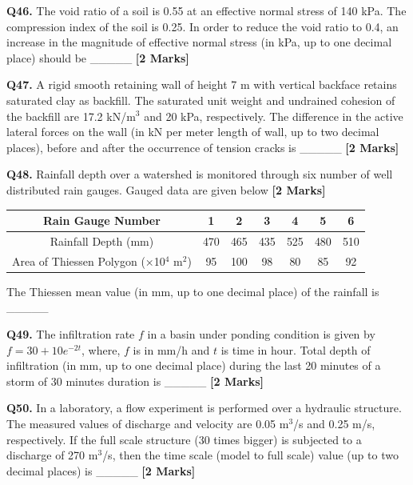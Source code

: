 \documentclass[11pt]{article}
\newcommand{\questionb}[2]{
    \noindent\textbf{Q#2.} #1 \hfill \textbf{[2 Marks]}
}
\begin{document}
\questionb{The void ratio of a soil is 0.55 at an effective normal stress of 140 kPa. The compression index of the soil is 0.25. In order to reduce the void ratio to 0.4, an increase in the magnitude of effective normal stress (in kPa, up to one decimal place) should be \_\_\_\_\_}{46}
\vspace{0.5cm}

\questionb{A rigid smooth retaining wall of height 7 m with vertical backface retains saturated clay as backfill. The saturated unit weight and undrained cohesion of the backfill are 17.2 kN/m\(^3\) and 20 kPa, respectively. The difference in the active lateral forces on the wall (in kN per meter length of wall, up to two decimal places), before and after the occurrence of tension cracks is \_\_\_\_\_}{47}
\vspace{0.5cm}

\questionb{Rainfall depth over a watershed is monitored through six number of well distributed rain gauges. Gauged data are given below}{48}

\begin{tabular}{|c|c|c|c|c|c|c|}
\hline
Rain Gauge Number & 1 & 2 & 3 & 4 & 5 & 6 \\
\hline
Rainfall Depth (mm) & 470 & 465 & 435 & 525 & 480 & 510 \\
Area of Thiessen Polygon (×10\(^4\) m\(^2\)) & 95 & 100 & 98 & 80 & 85 & 92 \\
\hline
\end{tabular}

The Thiessen mean value (in mm, up to one decimal place) of the rainfall is \_\_\_\_\_
\vspace{0.5cm}

\questionb{The infiltration rate \( f \) in a basin under ponding condition is given by \( f = 30 + 10e^{-2t} \), where, \( f \) is in mm/h and \( t \) is time in hour. Total depth of infiltration (in mm, up to one decimal place) during the last 20 minutes of a storm of 30 minutes duration is \_\_\_\_\_}{49}
\vspace{0.5cm}

\questionb{In a laboratory, a flow experiment is performed over a hydraulic structure. The measured values of discharge and velocity are 0.05 m\(^3\)/s and 0.25 m/s, respectively. If the full scale structure (30 times bigger) is subjected to a discharge of 270 m\(^3\)/s, then the time scale (model to full scale) value (up to two decimal places) is \_\_\_\_\_}{50}
\vspace{0.5cm}
\end{document}
